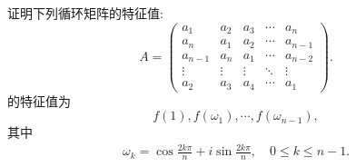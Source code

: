 \documentclass[../../main.tex]{subfiles}%
\begin{document}
\begin{proposition}[循环矩阵的特征值]\label{proposition:循环矩阵的特征值}
证明下列循环矩阵的特征值:
\[
A = \begin{pmatrix}
a_1 & a_2 & a_3 & \cdots & a_n \\
a_n & a_1 & a_2 & \cdots & a_{n-1} \\
a_{n-1} & a_n & a_1 & \cdots & a_{n-2} \\
\vdots & \vdots & \vdots & \ddots & \vdots \\
a_2 & a_3 & a_4 & \cdots & a_1
\end{pmatrix}.
\]
的特征值为 $$f(1), f(\omega_1), \cdots, f(\omega_{n-1}),$$
其中
\begin{align*}
\omega_k = \cos \frac{2k\pi}{n} + i \sin \frac{2k\pi}{n}, \quad 0 \leqslant  k \leqslant  n - 1.
\end{align*}
\end{proposition}
\end{document}
